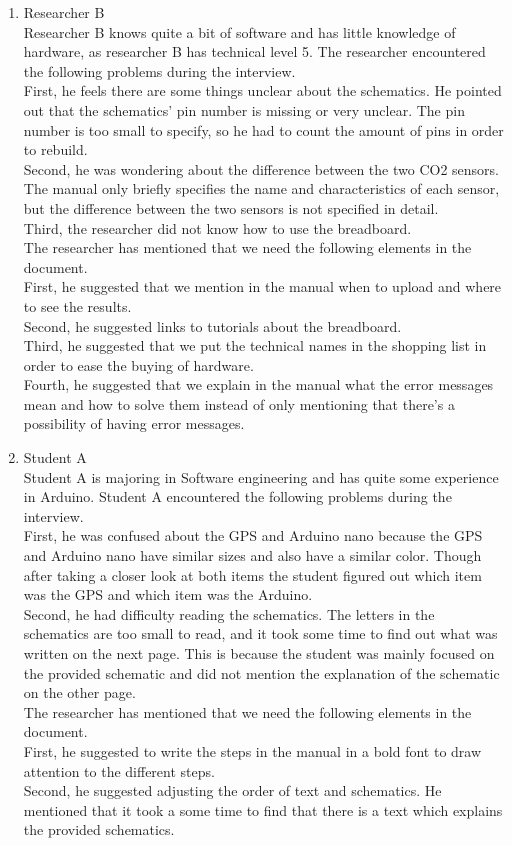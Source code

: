 \documentclass[conference]{IEEEtran}
\begin{document}
\begin{enumerate}
\begin{enumerate}
					\item Researcher B\\
					Researcher B knows quite a bit of software and has little knowledge of hardware, as researcher B has technical level 5. The researcher encountered the following problems during the interview.\\
					First, he feels there are some things unclear about the schematics. He pointed out that the schematics' pin number is missing or very unclear. The pin number is too small to specify, so he had to count the amount of pins in order to rebuild.\\
					Second, he was wondering about the difference between the two CO2 sensors. The manual only briefly specifies the name and characteristics of each sensor, but the difference between the two sensors is not specified in detail.\\
					Third, the researcher did not know how to use the breadboard.\\
					The researcher has mentioned that we need the following elements in the document.\\
					First, he suggested that we mention in the manual when to upload and where to see the results. \\
					Second, he suggested links to tutorials about the breadboard.\\
					Third, he suggested that we put the technical names in the shopping list in order to ease the buying of hardware.\\
					Fourth, he suggested that we explain in the manual what the error messages mean and how to solve them instead of only mentioning that there's a possibility of having error messages.\\
					
					\item Student A\\
					Student A is majoring in Software engineering and has  quite some experience in Arduino. Student A encountered the following problems during the interview.\\
					First, he was confused about the GPS and Arduino nano because the GPS and Arduino nano have similar sizes and also have a similar color. Though after taking a closer look at both items the student figured out which item was the GPS and which item was the Arduino.\\
					Second, he had difficulty reading the schematics. The letters in the schematics are too small to read, and it took some time to find out what was written on the next page. This is because the student was mainly focused on the provided schematic and did not mention the explanation of the schematic on the other page.\\
					The researcher has mentioned that we need the following elements in the document.\\
					First, he suggested to write the steps in the manual in a bold font to draw attention to the different steps.\\
					Second, he suggested adjusting the order of text and schematics. He mentioned that it took a some time to find that there is a text which explains the provided schematics.
					

\end{enumerate}
\end{enumerate}
\end{document}
